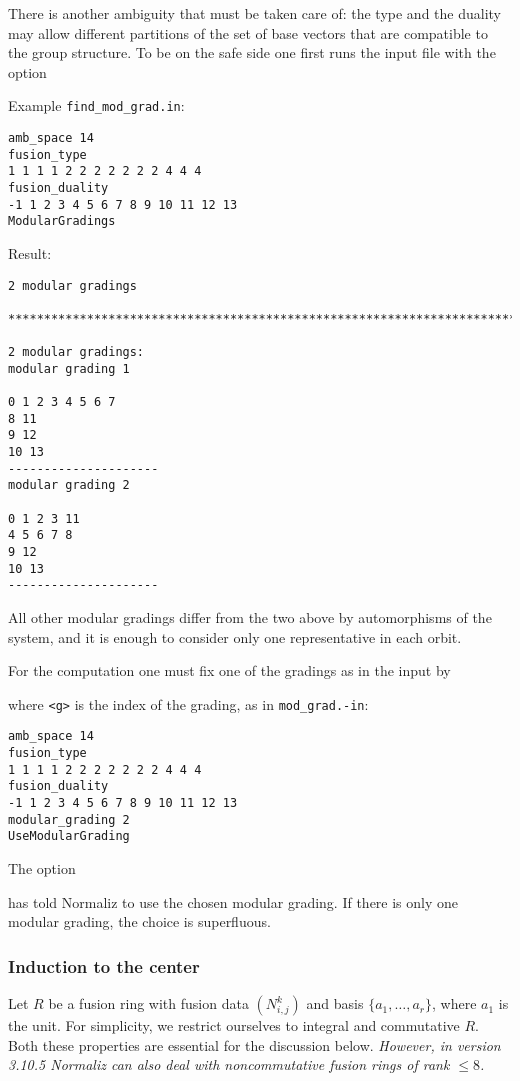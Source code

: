 There is another ambiguity that must be taken care of: the type and the duality may allow different partitions of the set of base vectors that are compatible to the group structure. To be on the safe side one first runs the input file with the option
\begin{itemize}
\itemtt[ModularGradings]
\end{itemize}
Example \verb*|find_mod_grad.in|:
\begin{Verbatim}
amb_space 14
fusion_type
1 1 1 1 2 2 2 2 2 2 2 4 4 4
fusion_duality
-1 1 2 3 4 5 6 7 8 9 10 11 12 13
ModularGradings
\end{Verbatim}
Result:
\begin{Verbatim}
2 modular gradings

***********************************************************************

2 modular gradings:
modular grading 1

0 1 2 3 4 5 6 7 
8 11 
9 12 
10 13 
---------------------
modular grading 2

0 1 2 3 11 
4 5 6 7 8 
9 12 
10 13 
---------------------
\end{Verbatim}
All other modular gradings differ from the two above by automorphisms of the system, and it is enough to consider only one representative in each orbit.

For the computation one must fix one of the gradings as in the input by
\begin{itemize}
\end{itemize}
where \verb*|<g>| is the index of the grading, as in \verb*|mod_grad.-in|:
\begin{Verbatim}
amb_space 14
fusion_type
1 1 1 1 2 2 2 2 2 2 2 4 4 4
fusion_duality
-1 1 2 3 4 5 6 7 8 9 10 11 12 13
modular_grading 2
UseModularGrading
\end{Verbatim}
The option
\begin{itemize}
\itemtt[UseModularGrading]
\end{itemize}
has told Normaliz  to use the chosen modular grading. If there is only one modular grading, the choice is superfluous.

\subsubsection{Induction to the center}

Let $R$ be a fusion ring with fusion data $(N_{i,j}^k)$ and basis $\{a_1, \ldots, a_r\}$, where $a_1$ is the unit. For simplicity, we restrict ourselves  to integral and commutative $R$. Both these properties are essential for the discussion below. \emph{However, in version 3.10.5 Normaliz can also deal with noncommutative fusion rings of rank $\le 8$.}

